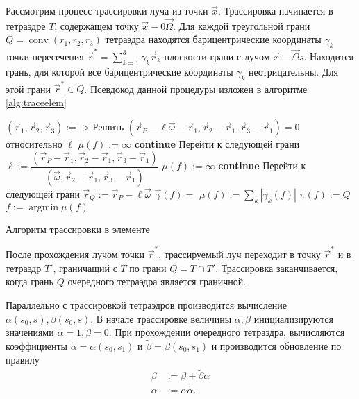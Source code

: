 Рассмотрим процесс трассировки луча из точки $\vec x$. Трассировка начинается в тетраэдре $T$, содержащем точку $\vec x - 0 \vec \Omega$. Для каждой треугольной грани $Q = \operatorname{conv}(r_1, r_2, r_3)$ тетраэдра находятся барицентрические координаты $\gamma_k$ точки пересечения $\vec r^* = \sum_{k=1}^3 \gamma_k \vec r_k$ плоскости грани с лучом $\vec x - \vec \Omega s$.  Находится грань, для которой все барицентрические координаты $\gamma_k$ неотрицательны. Для этой грани $\vec r^* \in Q$. Псевдокод данной процедуры изложен в алгоритме \ref{alg:traceelem}  
\begin{algorithm}[ht!]
\centering
\begin{algorithmic}[1]
\State $(\vec r_1, \vec r_2, \vec r_3) := $ 
\State $\triangleright$  Решить
$(
\vec r_P - \ell \vec \omega - \vec r_1,
\vec r_2 - \vec r_1,
\vec r_3 - \vec r_1
) = 0$ относительно $\ell$
\State $\mu(f) := \infty$
\State \textbf{continue} \Comment Перейти к следующей грани
\EndIf
\State $\ell := 
\dfrac{(\vec r_P - \vec r_1, \vec r_2 - \vec r_1, \vec r_3 - \vec r_1)}
{(\vec \omega, \vec r_2 - \vec r_1, \vec r_3 - \vec r_1)}$
\State $\mu(f) := \infty$
\State \textbf{continue} \Comment Перейти к следующей грани
\EndIf
\State $\vec r_Q := \vec r_P - \ell \vec \omega$
\State $\vec\gamma(f) = $ 
\State $\mu(f) := \sum_{k}|\gamma_k(f)|$
\State $\pi(f) := Q$
\EndFor
\State $f := \operatorname{argmin} \mu(f)$
\State{}
\EndFunction
\end{algorithmic}
\caption{Алгоритм трассировки в элементе}
\label{alg:traceelem}
\end{algorithm}

После прохождения лучом точки $\vec r^*$, трассируемый луч переходит в точку $\vec r^*$ и в тетраэдр $T'$, граничащий с $T$ по грани $Q = T \cap T'$.  Трассировка заканчивается, когда грань $Q$ очередного тетраэдра является граничной.

Параллельно с трассировкой тетраэдров производится вычисление $\alpha(s_0, s), \beta(s_0, s)$. В начале трассировке величины $\alpha, \beta$ инициализируются значениями $\alpha = 1, \beta = 0$.
При прохождении очередного тетраэдра, вычисляются коэффициенты $\tilde \alpha = \alpha(s_0, s_1)$ и $\tilde \beta = \beta(s_0, s_1)$ и производится обновление по правилу
\[\begin{aligned}
\beta &:= \beta + \tilde \beta \alpha\\
\alpha &:= \alpha \tilde \alpha.
\end{aligned}
\]

